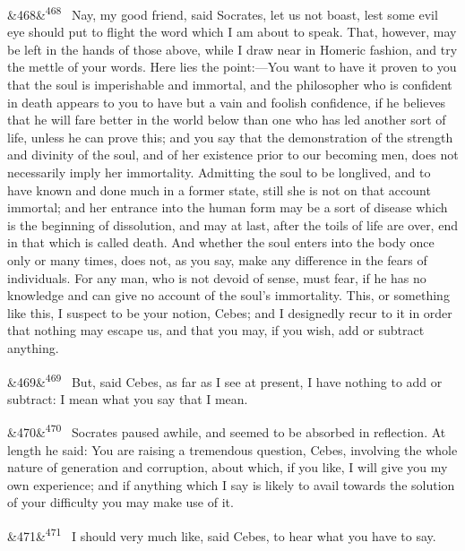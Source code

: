 \documentclass[12pt]{article}
\newcommand{\para}[1][]{\par\noindent\ifx&#1&\else\textsuperscript{\footnotesize #1}~\fi}
\begin{document}
\para[468] Nay, my good friend, said Socrates, let us not boast, lest some evil eye should put to flight the word which I am about to speak. That, however, may be left in the hands of those above, while I draw near in Homeric fashion, and try the mettle of your words. Here lies the point:---You want to have it proven to you that the soul is imperishable and immortal, and the philosopher who is confident in death appears to you to have but a vain and foolish confidence, if he believes that he will fare better in the world below than one who has led another sort of life, unless he can prove this; and you say that the demonstration of the strength and divinity of the soul, and of her existence prior to our becoming men, does not necessarily imply her immortality. Admitting the soul to be longlived, and to have known and done much in a former state, still she is not on that account immortal; and her entrance into the human form may be a sort of disease which is the beginning of dissolution, and may at last, after the toils of life are over, end in that which is called death. And whether the soul enters into the body once only or many times, does not, as you say, make any difference in the fears of individuals. For any man, who is not devoid of sense, must fear, if he has no knowledge and can give no account of the soul's immortality. This, or something like this, I suspect to be your notion, Cebes; and I designedly recur to it in order that nothing may escape us, and that you may, if you wish, add or subtract anything.

\para[469] But, said Cebes, as far as I see at present, I have nothing to add or subtract: I mean what you say that I mean.

\para[470] Socrates paused awhile, and seemed to be absorbed in reflection. At length he said: You are raising a tremendous question, Cebes, involving the whole nature of generation and corruption, about which, if you like, I will give you my own experience; and if anything which I say is likely to avail towards the solution of your difficulty you may make use of it.

\para[471] I should very much like, said Cebes, to hear what you have to say.
\end{document}
